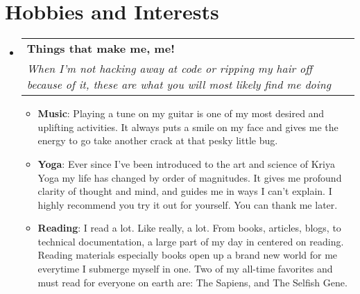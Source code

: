 \documentclass[letterpaper,11pt]{article}
\makeatletter
\newcommand{\resumeItem}[2]{
  \item\small{
    \textbf{#1}{: #2 \vspace{-2pt}}
  }
}
\newcommand{\resumeSubheading}[4]{
  \vspace{-1pt}\item
    \begin{tabular*}{0.97\textwidth}{l@{\extracolsep{\fill}}r}
      \textbf{#1} & #2 \\
      \textit{\small#3} & \textit{\small #4} \\
    \end{tabular*}\vspace{-5pt}
}
\newcommand{\resumeSubHeadingListStart}{\begin{itemize}[leftmargin=*]}
\newcommand{\resumeSubHeadingListEnd}{\end{itemize}}
\newcommand{\resumeItemListStart}{\begin{itemize}}
\newcommand{\resumeItemListEnd}{\end{itemize}\vspace{-5pt}}
\makeatother
\begin{document}
\section{Hobbies and Interests}
  \resumeSubHeadingListStart
      \resumeSubheading
      {Things that make me, me!}{}
      {When I'm not hacking away at code or ripping my hair off because of it, these are what you will most likely find me doing}{}
      \resumeItemListStart
      	\resumeItem{Music}{Playing a tune on my guitar is one of my most desired and uplifting activities. It always puts a smile on my face and gives me the energy to go take another crack at that pesky little bug.}
      	\resumeItem{Yoga}{Ever since I've been introduced to the art and science of Kriya Yoga my life has changed by order of magnitudes. It gives me profound clarity of thought and mind, and guides me in ways I can't explain. I highly recommend you try it out for yourself. You can thank me later.}
      	\resumeItem{Reading}{I read a lot. Like really, a lot. From books, articles, blogs, to technical documentation, a large part of my day in centered on reading. Reading materials especially books open up a brand new world for me everytime I submerge myself in one. Two of my all-time favorites and must read for everyone on earth are: The Sapiens, and The Selfish Gene.}
      \resumeItemListEnd    
 \resumeSubHeadingListEnd
\end{document}
